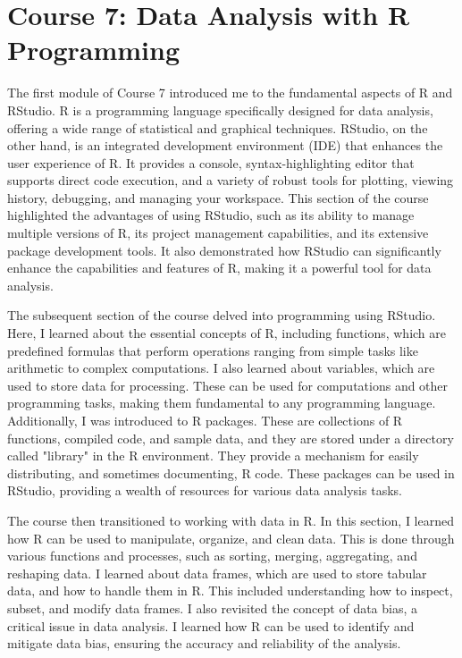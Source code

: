 \documentclass[]{article}
\begin{document}
\section{Course 7: Data Analysis with R Programming}
The first module of Course 7 introduced me to the fundamental aspects of R and RStudio. R is a programming language specifically designed for data analysis, offering a wide range of statistical and graphical techniques. RStudio, on the other hand, is an integrated development environment (IDE) that enhances the user experience of R. It provides a console, syntax-highlighting editor that supports direct code execution, and a variety of robust tools for plotting, viewing history, debugging, and managing your workspace. This section of the course highlighted the advantages of using RStudio, such as its ability to manage multiple versions of R, its project management capabilities, and its extensive package development tools. It also demonstrated how RStudio can significantly enhance the capabilities and features of R, making it a powerful tool for data analysis.

The subsequent section of the course delved into programming using RStudio. Here, I learned about the essential concepts of R, including functions, which are predefined formulas that perform operations ranging from simple tasks like arithmetic to complex computations. I also learned about variables, which are used to store data for processing. These can be used for computations and other programming tasks, making them fundamental to any programming language. Additionally, I was introduced to R packages. These are collections of R functions, compiled code, and sample data, and they are stored under a directory called "library" in the R environment. They provide a mechanism for easily distributing, and sometimes documenting, R code. These packages can be used in RStudio, providing a wealth of resources for various data analysis tasks.

The course then transitioned to working with data in R. In this section, I learned how R can be used to manipulate, organize, and clean data. This is done through various functions and processes, such as sorting, merging, aggregating, and reshaping data. I learned about data frames, which are used to store tabular data, and how to handle them in R. This included understanding how to inspect, subset, and modify data frames. I also revisited the concept of data bias, a critical issue in data analysis. I learned how R can be used to identify and mitigate data bias, ensuring the accuracy and reliability of the analysis.
\end{document}
